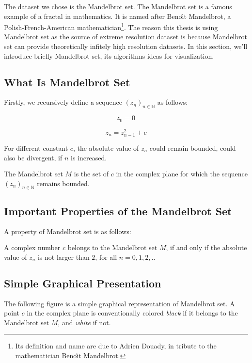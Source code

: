 The dataset we chose is the Mandelbrot set. The Mandelbrot set is a famous example of a fractal in mathematics. It is named after Beno\^{\i}t Mandelbrot, a Polish-French-American mathematician\footnote{ Its definition and name are due to Adrien Douady, in tribute to the mathematician Beno\^{\i}t Mandelbrot\cite{wiki:mandel}.}. The reason this thesis is using Mandelbrot set as the source of extreme resolution dataset is because Mandelbrot set can provide theoretically infitely high resolution datasets. In this section, we'll introduce briefly Mandelbrot set, its algorithms ideas for visualization.

\subsection*{What Is Mandelbrot Set}

Firstly, we recursively define a sequence $\displaystyle (z_{n})_{n\in \mathbb {N} }$ as follows:

\begin{equation}
    z_0 = 0
\end{equation}

\begin{equation}
    z_{n} = z_{n-1}^2 + c
\end{equation}

For different constant $c$, the absolute value of $z_n$ could remain bounded, could also be divergent, if $n$ is increased.

The Mandelbrot set $M$ is the set of $c$ in the complex plane for which the sequence $\displaystyle (z_{n})_{n\in \mathbb {N} }$ remains bounded.

\subsection*{Important Properties of the Mandelbrot Set}

A property of Mandelbrot set is as follows:

A complex number $c$ belongs to the Mandelbrot set $M$, if and only if the absolute value of $z_n$ is not larger than $2$, for all $n = 0, 1, 2, ..$

\subsection*{Simple Graphical Presentation}

The following figure  is a simple graphical representation of Mandelbrot set. A point $c$ in the complex plane is conventionally colored \emph{black} if it belongs to the Mandelbrot set $M$, and \emph{white} if not. 


